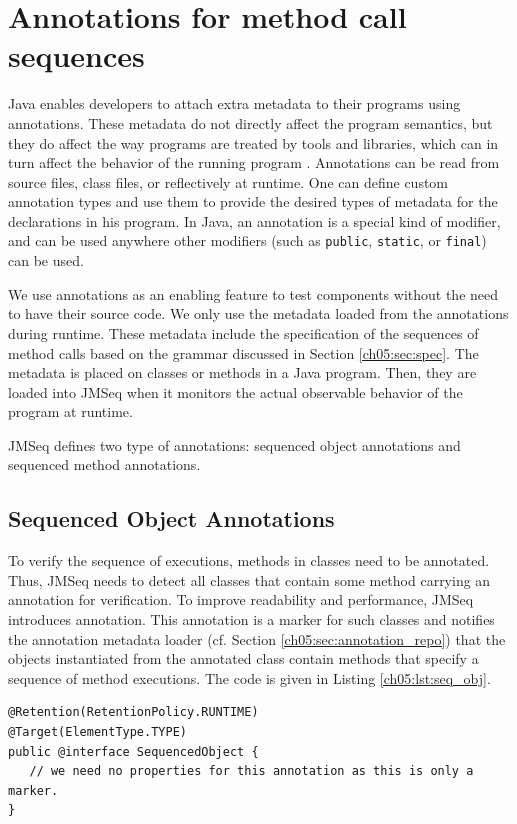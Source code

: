 \section{Annotations for method call sequences} \label{ch05:sec:impl_annot}
Java enables developers to attach extra metadata to their programs using annotations.
These metadata do not directly affect the program semantics, but they do affect the
way programs are treated by tools and libraries, which can in turn affect the
behavior of the running program \cite{Java_5_Annotations}. Annotations can be
read from source files, class files, or reflectively at runtime. 
One can define custom annotation types and use them to provide the desired types of metadata for the declarations in his program. 
In Java, an annotation is a special kind of modifier, and can be used anywhere other
modifiers (such as {\small\texttt{public}}, {\small\texttt{static}}, or
{\small\texttt{final}}) can be used.

We use annotations as an enabling feature to test components without the need to have their source code.
We only use the metadata loaded from the annotations during runtime.
These metadata include the specification of the sequences of method calls
based on the grammar discussed in Section \ref{ch05:sec:spec}. The metadata
is placed on classes or methods in a Java program. 
Then, they are loaded into JMSeq when it monitors the actual observable
behavior of the program at runtime.

JMSeq defines two type of annotations: sequenced object annotations and
sequenced method annotations.

\subsection{Sequenced Object Annotations}

To verify the sequence of executions, methods in classes need to be
annotated. Thus, JMSeq needs to detect all  classes that contain
some method carrying an annotation for verification. 
To improve readability and performance, JMSeq introduces
 annotation. This annotation is a marker
for such classes and notifies the annotation metadata loader (cf.
Section \ref{ch05:sec:annotation_repo}) that the objects instantiated from the annotated
class contain methods that specify a sequence of method executions. 
The code is given in Listing \ref{ch05:lst:seq_obj}.


\lstset{language=Java}
\begin{lstlisting}[label=ch05:lst:seq_obj, caption=SequencedObject Annotation Declaration]
@Retention(RetentionPolicy.RUNTIME)
@Target(ElementType.TYPE)
public @interface SequencedObject {
   // we need no properties for this annotation as this is only a marker.
}
\end{lstlisting}

